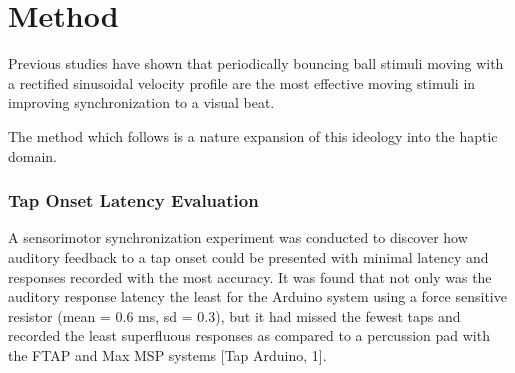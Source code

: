 \chapter{Method}


Previous studies have shown that periodically bouncing ball stimuli moving with a rectified sinusoidal velocity profile are the most effective moving stimuli in improving synchronization to a visual beat.~\cite{gan2015synchronization}

The method which follows is a nature expansion of this ideology into the haptic domain.


\subsection{Tap Onset Latency Evaluation}

A sensorimotor synchronization experiment was conducted to discover how auditory feedback to a tap onset could be presented with minimal latency and responses recorded with the most accuracy. It was found that not only was the auditory response latency the least for the Arduino system using a force sensitive resistor (mean = 0.6 ms, sd = 0.3), but it had missed the fewest taps and recorded the least superfluous responses as compared to a percussion pad with the FTAP and Max MSP systems [Tap Arduino, 1].
